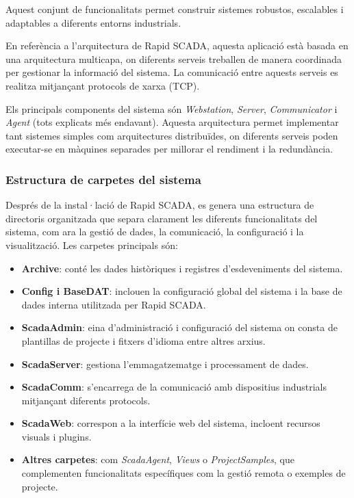 \documentclass[a4paper,11pt,DIV=13,headings=normal,abstract=true,twoside=semi]{article}
\begin{document}
Aquest conjunt de funcionalitats permet construir sistemes robustos, escalables i adaptables a diferents entorns industrials.

En referència a l'arquitectura de Rapid SCADA, aquesta aplicació està basada en una arquitectura multicapa, on diferents serveis treballen de manera coordinada per gestionar la informació del sistema. La comunicació entre aquests serveis es realitza mitjançant protocols de xarxa (TCP).

Els principals components del sistema són \textit{Webstation}, \textit{Server}, \textit{Communicator} i \textit{Agent} (tots explicats més endavant). Aquesta arquitectura permet implementar tant sistemes simples com arquitectures distribuïdes, on diferents serveis poden executar-se en màquines separades per millorar el rendiment i la redundància.

\subsubsection{Estructura de carpetes del sistema}


Després de la instal·lació de Rapid SCADA, es genera una estructura de directoris organitzada que separa clarament les diferents funcionalitats del sistema, com ara la gestió de dades, la comunicació, la configuració i la visualització. Les carpetes principals són:


\begin{itemize}
    \item \textbf{Archive}: conté les dades històriques i registres d'esdeveniments del sistema.     
    \item \textbf{Config i BaseDAT}: inclouen la configuració global del sistema i la base de dades interna utilitzada per Rapid SCADA.

    \item \textbf{ScadaAdmin}: eina d'administració i configuració del sistema on consta de plantillas de projecte i fitxers d'idioma entre altres arxius.

    \item \textbf{ScadaServer}: gestiona l'emmagatzematge i processament de dades.

    \item \textbf{ScadaComm}: s'encarrega de la comunicació amb dispositius industrials mitjançant diferents protocols.


    \item \textbf{ScadaWeb}: correspon a la interfície web del sistema, incloent recursos visuals i plugins.

    \item \textbf{Altres carpetes}: com \textit{ScadaAgent}, \textit{Views} o \textit{ProjectSamples}, que complementen funcionalitats específiques com la gestió remota o exemples de projecte.

\end{itemize}
\end{document}
